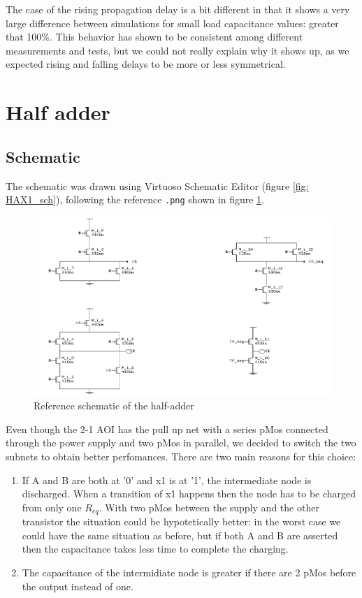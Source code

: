 \documentclass[a4paper]{article}
\begin{document}
The case of the rising propagation delay is a bit different in that it shows a very large difference between simulations for small load capacitance values: greater that 100\%. This behavior has shown to be consistent among different measurements and tests, but we could not really explain why it shows up, as we expected rising and falling delays to be more or less symmetrical.

\newpage
\section{Half adder}
\subsection{Schematic}
The schematic was drawn using Virtuoso Schematic Editor (figure \ref{fig: HAX1_sch}), following the reference \texttt{.png} shown in figure \ref{fig: HAX1_png}.

\begin{figure}[H]
	\includegraphics[width=0.9\linewidth]{./Images/HA/HA_X1.png}
	\caption{Reference schematic of the half-adder}
	\label{fig: HAX1_png}
\end{figure}

Even though the 2-1 AOI has the pull up net with a series pMos connected through the power supply and two pMos in parallel, we decided to switch the two subnets to obtain better perfomances. There are two main reasons for this choice:
\begin{enumerate}
\item If A and B are both at '0' and x1 is at '1', the intermediate node is discharged. When a transition of x1 happens then the node has to be charged from only one $R_{eq}$. With two pMos between the supply and the other transistor the situation could be hypotetically better: in the worst case we could have the same situation as before, but if both A and B are asserted then the capacitance takes less time to complete the charging.
\item The capacitance of the intermidiate node is greater if there are 2 pMos before the output instead of one.
\end{enumerate}
\end{document}

